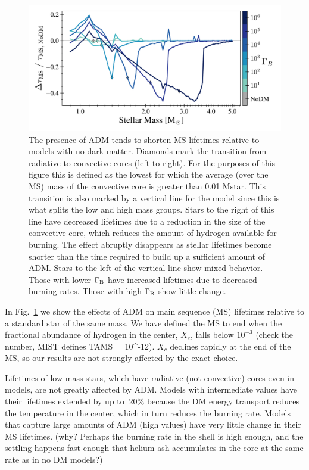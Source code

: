 \documentclass[useAMS,usenatbib]{mnras}
\begin{document}
\begin{figure}
  \centering
  \includegraphics[width=\textwidth]{plots/mstau.png}
  \caption{The presence of ADM tends to shorten MS lifetimes relative to models with no dark matter.
  Diamonds mark the transition from radiative to convective cores (left to right). For the purposes of this figure this is defined as the lowest \Mstar for which the average (over the MS) mass of the convective core is greater than 0.01 Mstar. This transition is also marked by a vertical line for the \nodm model since this is what splits the low and high mass groups. Stars to the right of this line have decreased lifetimes due to a reduction in the size of the convective core, which reduces the amount of hydrogen available for burning. The effect abruptly disappears as stellar lifetimes become shorter than the time required to build up a sufficient amount of ADM. Stars to the left of the vertical line show mixed behavior. Those with lower $\Gamma_\mathrm{B}$ have increased lifetimes due to decreased burning rates. Those with high $\Gamma_\mathrm{B}$ show little change.
  }
  \label{fig:mstau}
\end{figure}

In Fig.~\ref{fig:mstau} we show the effects of ADM on main sequence (MS) lifetimes relative to a standard \nodm star of the same mass. We have defined the MS to end when the fractional abundance of hydrogen in the center, $X_c$, falls below $10^{-3}$ (check the number, MIST defines TAMS = 10^-12). $X_c$ declines rapidly at the end of the MS, so our results are not strongly affected by the exact choice.

Lifetimes of low mass stars, which have radiative (not convective) cores even in \nodm models, are not greatly affected by ADM. Models with intermediate \gammaB values have their lifetimes extended by up to $~20\%$ because the DM energy transport reduces the temperature in the center, which in turn reduces the burning rate. Models that capture large amounts of ADM (high \gammaB values) have very little change in their MS lifetimes. (why? Perhaps the burning rate in the shell is high enough, and the settling happens fast enough that helium ash accumulates in the core at the same rate as in no DM models?)
\end{document}
